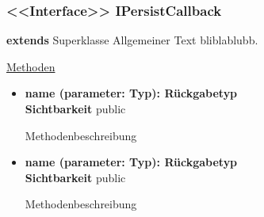 \subsubsection{<<Interface>> IPersistCallback} \label{app:klasse:IPersistCallback}
\textbf{extends} Superklasse \newline
Allgemeiner Text bliblablubb. \newline

\underline{Methoden}
\begin{itemize}
\itemsep0pt
\item \textbf{name (parameter: Typ): Rückgabetyp}\hfill\\
\textbf{Sichtbarkeit} public

Methodenbeschreibung

\item \textbf{name (parameter: Typ): Rückgabetyp}\hfill\\
\textbf{Sichtbarkeit} public

Methodenbeschreibung

\end{itemize}